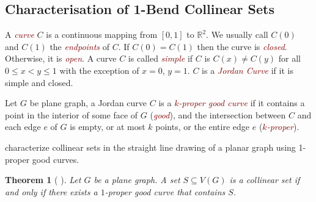 \documentclass[11pt]{article}
\newtheorem{thm}{Theorem}
\newcommand{\defin}[1]{\emph{\textcolor{Maroon}{#1}}}
\theoremstyle{definition}
\begin{document}


\subsection{Characterisation of 1-Bend Collinear Sets}
A \defin{curve} $C$ is a continuous mapping from $[0, 1]$ to $\mathbb{R}^2$. We usually call $C(0)$ and $C(1)$ the \defin{endpoints} of $C$. If $C(0)=C(1)$ then  the curve is \defin{closed}. Otherwise, it is \defin{open}. A curve $C$ is called \defin{simple} if $C$ is $C(x) \neq C(y)$ for all $0\le x<y\le 1$ with the exception of $x=0$, $y=1$. $C$ is a \defin{Jordan Curve} if it is simple and closed.

Let $G$ be plane graph, a Jordan curve $C$ is a \defin{$k$-proper good curve} if it contains a point in the interior of some face of $G$ (\defin{good}), and the intersection between $C$ and each edge $e$ of $G$ is empty, or at most $k$ points, or the entire edge $e$ (\defin{$k$-proper}).

\citet{DBLP:journals/jocg/LozzoDFMR18} characterize collinear sets in the straight line drawing of a planar graph using 1-proper good curves.

\begin{thm}[\cite{DBLP:journals/jocg/LozzoDFMR18} ] \label{straightline-topological}
Let $G$ be a plane graph. A set $S \subseteq V(G)$ is a collinear set if and only if there exists a $1$-proper good curve that contains $S$.
\end{thm}
\end{document}
